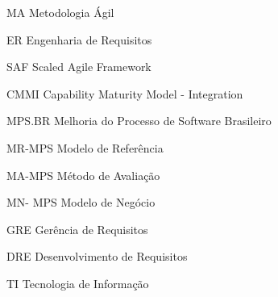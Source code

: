 \begin{siglas}
\item[MA] Metodologia Ágil
\item[ER] Engenharia de Requisitos
\item[SAF] Scaled Agile Framework
\item[CMMI] Capability Maturity Model - Integration
\item[MPS.BR] Melhoria do Processo de Software Brasileiro
\item[MR-MPS] Modelo de Referência
\item[MA-MPS] Método de Avaliação
\item[MN- MPS] Modelo de Negócio
\item[GRE] Gerência de Requisitos
\item[DRE] Desenvolvimento de Requisitos
\item[TI] Tecnologia de Informação
\end{siglas}
